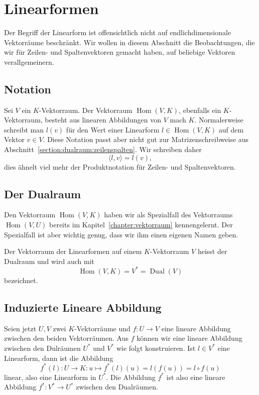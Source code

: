 %
%
%

\section{Linearformen}
Der Begriff der Linearform ist offensichtlich nicht auf endlichdimensionale
Vektorräume beschränkt.
Wir wollen in diesem Abschnitt die Beobachtungen, die wir für Zeilen-
und Spaltenvektoren gemacht haben, auf beliebige Vektoren verallgemeinern.

\subsection{Notation}
Sei $V$ ein $K$-Vektorraum.
Der Vektorraum $\operatorname{Hom}(V,K)$, ebenfalls ein $K$-Vektorraum,
besteht aus linearen Abbildungen von $V$ mach $K$.
Normalerweise schreibt man $l(v)$ für den Wert einer Linearform
$l\in\operatorname{Hom}(V,K)$ auf dem Vektor $v\in V$.
Diese Notation passt aber nicht gut zur Matrizenschreibweise aus
Abschnitt~\ref{section:dualraum:zeilenspalten}.
Wir schreiben daher 
\[
\langle l,v\rangle = l(v),
\]
dies ähnelt viel mehr der Produktnotation für Zeilen- und Spaltenvektoren.

\subsection{Der Dualraum}
Den Vektorraum $\operatorname{Hom}(V,K)$ haben wir
als Spezialfall des Vektorraums $\operatorname{Hom}(V,U)$
bereits im
Kapitel~\ref{chapter:vektorraum} kennengelernt.
Der Spezialfall ist aber wichtig genug, dass wir ihm einen eigenen Namen
geben.

\begin{definition}
Der Vektorraum der Linearformen auf einem $K$-Vektorraum $V$ heisst
der Dualraum und wird auch mit
\[
\operatorname{Hom}(V,K) = V^* = \operatorname{Dual}(V)
\]
bezeichnet.
\end{definition}

%

\subsection{Induzierte Lineare Abbildung}
Seien jetzt $U,V$ zwei $K$-Vektorräume und $f\colon U\to V$ eine lineare
Abbildung zwischen den beiden Vektorräumen.
Aus $f$ können wir eine lineare Abbildung zwischen den Dulräumen
$U^*$ und $V^*$ wie folgt konstruieren.
Ist $l\in V^*$ eine Linearform, dann ist die Abbildung
\[
f^*(l)\colon U\to K:u\mapsto f^*(l)(u)=l(f(u)) = l\circ f(u)
\]
linear, also eine Linearform in $U^*$.
Die Abbildung $f^*$ ist also eine lineare Abbildung $f^*\colon V^*\to U^*$
zwischen den Dualräumen.

